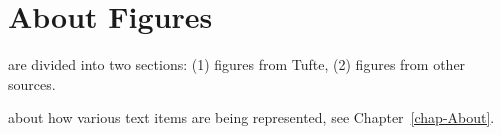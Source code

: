 \chapter{About Figures}
\label{chap-Figures}
 are divided into two sections: 
(1) figures from Tufte,
(2) figures from other sources.

 about how various text items are being represented,
see Chapter~\ref{chap-About}.


